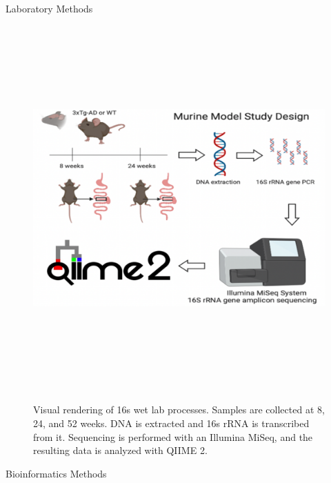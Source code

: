 \documentclass[final]{beamer}
\newlength{\colwidth}
\begin{document}
\begin{frame}[t]
\begin{columns}[t]
\begin{column}{\colwidth}
\begin{block}{Laboratory Methods}
  \begin{figure}[tph!]
    {\includegraphics[height=14cm]{assets/16s_lab_methods}}
    \caption{Visual rendering of 16s wet lab processes. Samples are collected at 8, 24, and 52 weeks. DNA is extracted and 16s rRNA is transcribed from it. Sequencing is performed with an Illumina MiSeq, and the resulting data is analyzed with QIIME 2.}
    \label{fig:16sMethods}
  \end{figure}

  \end{block}

  \begin{block}{Bioinformatics Methods}


\end{block}
\end{column}
\end{columns}
\end{frame}
\end{document}
